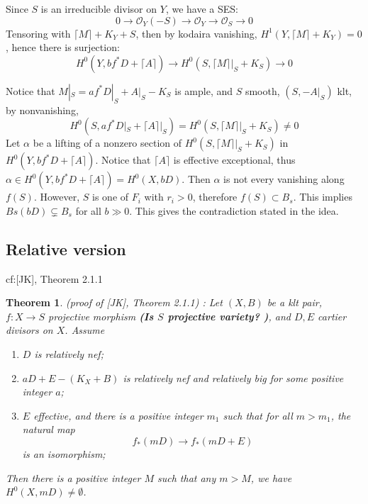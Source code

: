 \documentclass{article}
\newtheorem{thm}[defn]{Theorem}
\begin{document}
Since $ S $ is an irreducible divisor on $ Y $, we have a SES:
\[ 0\to \mathcal{O}_Y(-S)\to \mathcal{O}_Y\to \mathcal{O}_S\to 0 \]
Tensoring with $ \lceil M\rceil +K_Y+S $, then by kodaira vanishing, $ H^1(Y,\lceil M\rceil +K_Y)=0 $, hence there is surjection:
\[ H^0(Y,bf^*D+\lceil A\rceil)\to H^0(S,\lceil M\rceil|_S +K_S)\to 0 \]

Notice that $ M|_S=af^*D|_S+A|_S-K_S $ is ample, and $ S $ smooth, $ (S,-A|_S) $ klt, by nonvanishing, 
\[ H^0(S,af^*D|_S+\lceil A\rceil|_S)=H^0(S,\lceil M\rceil|_S +K_S)\neq 0 \]
Let $ \alpha $ be a lifting of a nonzero section of $ H^0(S,\lceil M\rceil|_S +K_S) $ in $ H^0(Y,bf^*D+\lceil A\rceil) $. Notice that $ \lceil A\rceil $ is effective exceptional, thus $ \alpha \in H^0(Y,bf^*D+\lceil A\rceil)=H^0(X,bD) $. Then $ \alpha $ is not every vanishing along $ f(S) $. However, $ S $ is one of $ F_i $ with $ r_i>0 $, therefore $ f(S)\subset B_s $. This implies $ Bs(bD)\subsetneq B_s $ for all $ b\gg 0 $. This gives the contradiction stated in the idea.
\subsection{Relative version}
cf:[JK], Theorem 2.1.1

\begin{thm}
  (proof of [JK], Theorem 2.1.1) : Let $ (X,B) $ be a klt pair, $ f:X\to S $ projective morphism \textbf{(Is $ S $ projective variety? )}, and $ D,E $ cartier divisors on $ X $. Assume
  \begin{enumerate}
    \item $ D $ is relatively nef;
    \item $ aD+E-(K_X+B) $ is relatively nef and relatively big for some positive integer $ a $;
    \item $ E $ effective, and there is a positive integer $ m_1 $ such that for all $ m>m_1 $, the natural map 
    \[ f_*(mD)\to f_*(mD+E) \]
    is an isomorphism;
  \end{enumerate}
  Then there is a positive integer $ M $ such that any $ m>M $, we have $ H^0(X,mD)\neq \emptyset $.
\end{thm}
\end{document}
